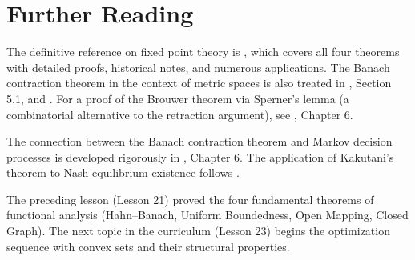 \documentclass[11pt,a4paper]{article}
\begin{document}

\section{Further Reading}
\label{sec:further}

The definitive reference on fixed point theory is
\citet{granas2003}, which covers all four theorems with detailed
proofs, historical notes, and numerous applications.  The Banach
contraction theorem in the context of metric spaces is also treated
in \citet{kreyszig1989}, Section 5.1, and \citet{rudin1991}.  For a
proof of the Brouwer theorem via Sperner's lemma (a combinatorial
alternative to the retraction argument), see
\citet{granas2003}, Chapter 6.

The connection between the Banach contraction theorem and Markov
decision processes is developed rigorously in
\citet{puterman2014}, Chapter 6.  The application of Kakutani's
theorem to Nash equilibrium existence follows \citet{kakutani1941}.

The preceding lesson (Lesson 21) proved the four fundamental theorems
of functional analysis (Hahn--Banach, Uniform Boundedness, Open
Mapping, Closed Graph).  The next topic in the curriculum (Lesson 23)
begins the optimization sequence with convex sets and their
structural properties.


\end{document}

